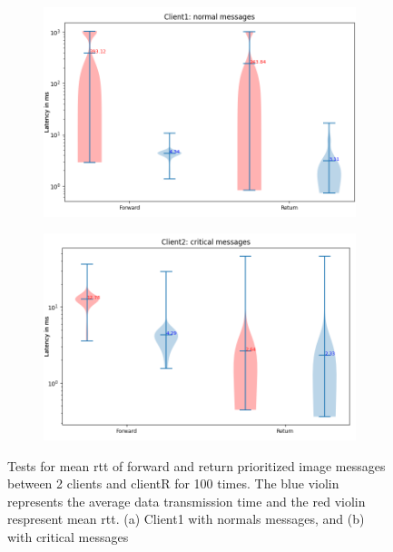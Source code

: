 \begin{figure}[htb]
    \centering
    \begin{subfigure}[b]{0.99\textwidth}
    \includegraphics[width=\textwidth]{figures/appendix/priority_tests/log_violin_2clients_image_priority_client1.png}\hfill 
    \caption{} \label{fig: priority-2clients-image-1}
    \end{subfigure}
    \begin{subfigure}[b]{0.99\textwidth}
        \includegraphics[width=\textwidth]{figures/appendix/priority_tests/log_violin_2clients_image_priority_client2.png}\hfill 
        \caption{} \label{fig: priority-2clients-image-2}
    \end{subfigure}
    
    
    \caption{Tests for mean \gls{rtt} of forward and return prioritized image messages between 2 clients 
    and clientR for 100 times. The blue violin represents the average data transmission time and the red violin 
    respresent mean \gls{rtt}. (a) Client1 with normals messages, and (b) 
    with critical messages} \label{fig: priority-2clients-image}
\end{figure}



